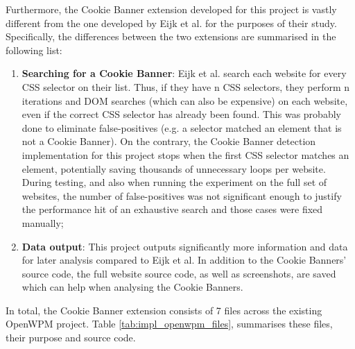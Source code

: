 \documentclass[../main.tex]{subfiles}
\begin{document}
Furthermore, the Cookie Banner extension developed for this project is vastly different from the one developed by Eijk et al. for the purposes of their study. Specifically, the differences between the two extensions are summarised in the following list:

\begin{enumerate}
    \item \textbf{Searching for a Cookie Banner}: Eijk et al. search each website for every CSS selector on their list. Thus, if they have n CSS selectors, they perform n iterations and DOM searches (which can also be expensive) on each website, even if the correct CSS selector has already been found. This was probably done to eliminate false-positives (e.g. a selector matched an element that is not a Cookie Banner). On the contrary, the Cookie Banner detection implementation for this project stops when the first CSS selector matches an element, potentially saving thousands of unnecessary loops per website. During testing, and also when running the experiment on the full set of websites, the number of false-positives was not significant enough to justify the performance hit of an exhaustive search and those  cases were fixed manually;
    
    \item \textbf{Data output}: This project outputs significantly more information and data for later analysis compared to Eijk et al. In addition to the Cookie Banners’ source code, the full website source code, as well as screenshots, are saved which can help when analysing the Cookie Banners.
\end{enumerate}

In total, the Cookie Banner extension consists of 7 files across the existing OpenWPM project. Table \ref{tab:impl_openwpm_files}, summarises these files, their purpose and source code.
\end{document}
